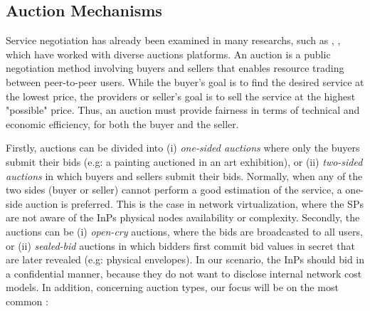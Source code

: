 \subsection{Auction Mechanisms} \label{auctionMechanisms}

Service negotiation has already been examined in many researchs, such as \citep{hausheer2005peermart}, \cite{ogston2002peer}, which have worked with diverse auctions platforms. An auction is a public negotiation method involving buyers and sellers that enables resource trading between peer-to-peer users. While the buyer's goal is to find the desired service at the lowest price, the providers or seller's goal is to sell the service at the highest "possible" price. Thus, an auction must provide fairness in terms of technical and economic efficiency, for both the buyer and the seller.

Firstly, auctions can be divided into (i) \textit{one-sided auctions} where only the buyers submit their bids (e.g: a painting auctioned in an art exhibition), or (ii) \textit{two-sided auctions} in which buyers and sellers submit their bids. Normally, when any of the two sides (buyer or seller) cannot perform a good estimation of the service, a one-side auction is preferred. This is the case in network virtualization, where the SPs are not aware of the InPs physical nodes availability or complexity. Secondly, the auctions can be (i) \textit{open-cry} auctions, where the bids are broadcasted to all users, or (ii) \textit{sealed-bid} auctions in which bidders first commit bid values in secret that are later revealed (e.g: physical envelopes). In our scenario, the InPs should bid in a confidential manner, because they do not want to disclose internal network cost models. In addition, concerning auction types, our focus will be on the most common \cite{coppinger1980incentives}: 

